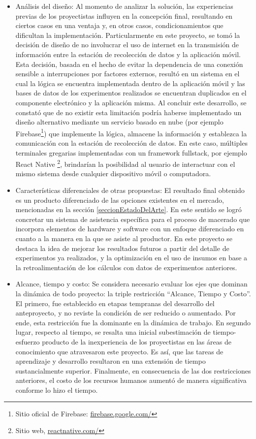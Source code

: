 \begin{itemize}
        \item{Análisis del diseño:} Al momento de analizar la solución, las experiencias previas de los proyectistas influyen en la concepción final, resultando en ciertos casos en una ventaja y, en otros casos, condicionamientos que dificultan la implementación. Particularmente en este proyecto, se tomó la decisión de diseño de no involucrar el uso de internet en la transmisión de información entre la estación de recolección de datos y la aplicación móvil. Esta decisión, basada en el hecho de evitar la dependencia de una conexión sensible a interrupciones por factores externos, resultó en un sistema en el cual la lógica se encuentra implementada dentro de la aplicación móvil y las bases de datos de los experimentos realizados se encuentran duplicados en el componente electrónico y la aplicación misma. Al concluir este desarrollo, se constató que de no existir esta limitación podría haberse implementado un diseño alternativo mediante un servicio basado en nube (por ejemplo Firebase\footnote{Sitio oficial de Firebase: \url{firebase.google.com/}}) que implemente la lógica, almacene la información y establezca la comunicación con la estación de recolección de datos. En este caso, múltiples terminales gregarias implementadas con un framework fullstack, por ejemplo React Native \footnote{Sitio web, \url{reactnative.com/}}, brindarían la posibilidad al usuario de interactuar con el mismo sistema desde cualquier dispositivo móvil o computadora. 
        
        \item{Características diferenciales de otras propuestas:}
        El resultado final obtenido es un producto diferenciado de las opciones existentes en el mercado, mencionadas en la sección \ref{seccionEstadoDelArte}. En este sentido se logró concretar un sistema de asistencia específica para el proceso de macerado que incorpora elementos de hardware y software con un enfoque diferenciado en cuanto a la manera en la que se asiste al productor. En este proyecto se destaca la idea de mejorar los resultados futuros a partir del detalle de experimentos ya realizados, y la optimización en el uso de insumos en base a la retroalimentación de los cálculos con datos de experimentos anteriores.
        
        \item{ Alcance, tiempo y costo: } Se considera necesario evaluar los ejes que dominan la dinámica de todo proyecto: la triple restricción ``Alcance, Tiempo y Costo''. El primero, fue establecido en etapas tempranas del desarrollo del anteproyecto, y no reviste la condición de ser reducido o aumentado. Por ende, esta restricción fue la dominante en la dinámica de trabajo. En segundo lugar, respecto al tiempo, se resalta una inicial subestimación de tiempo-esfuerzo producto de la inexperiencia de los proyectistas en las áreas de conocimiento que atravesaron este proyecto. Es así, que las tareas de aprendizaje y desarrollo resultaron en una extensión de tiempo sustancialmente superior. Finalmente, en consecuencia de las dos restricciones anteriores, el costo de los recursos humanos aumentó de manera significativa conforme lo hizo el tiempo.
        

\end{itemize}
